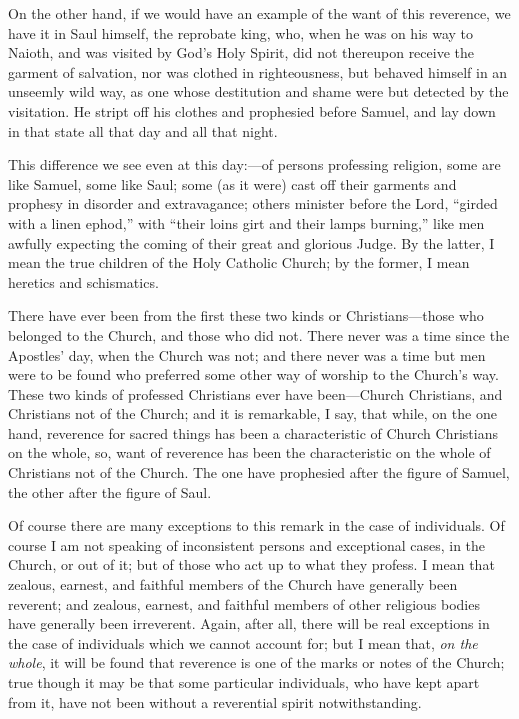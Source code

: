 On the other hand, if we would have an example of the want of this
reverence, we have it in Saul himself, the reprobate king, who, when
he was on his way to Naioth, and was visited by God's Holy Spirit, did
not thereupon receive the garment of salvation, nor was clothed in
righteousness, but behaved himself in an unseemly wild way, as one
whose destitution and shame were but detected by the visitation. He
stript off his clothes and prophesied before Samuel, and lay down in
that state all that day and all that night.

This difference we see even at this day:—of persons professing
religion, some are like Samuel, some like Saul; some (as it were) cast
off their garments and prophesy in disorder and extravagance; others
minister before the Lord, ``girded with a linen ephod,'' with
``their loins girt and their lamps burning,'' like men awfully
expecting the coming of their great and glorious Judge. By the latter,
I mean the true children of the Holy Catholic Church; by the former, I
mean heretics and schismatics.

There have ever been from the first these two kinds or Christians—those
who belonged to the Church, and those who did not. There never was a
time since the Apostles' day, when the Church was not; and there never
was a time but men were to be found who preferred some other way of
worship to the Church's way. These two kinds of professed Christians
ever have been—Church Christians, and Christians not of the Church;
and it is remarkable, I say, that while, on the one hand, reverence
for sacred things has been a characteristic of Church Christians on
the whole, so, want of reverence has been the characteristic on the
whole of Christians not of the Church. The one have prophesied after
the figure of Samuel, the other after the figure of Saul.

Of course there are many exceptions to this remark in the case of
individuals. Of course I am not speaking of inconsistent persons and
exceptional cases, in the Church, or out of it; but of those who act
up to what they profess. I mean that zealous, earnest, and faithful
members of the Church have generally been reverent; and zealous,
earnest, and faithful members of other religious bodies have generally
been irreverent. Again, after all, there will be real exceptions in
the case of individuals which we cannot account for; but I mean that, \emph{on
the whole}, it will be found that reverence is one of the marks or
notes of the Church; true though it may be that some particular
individuals, who have kept apart from it, have not been without a
reverential spirit notwithstanding.

